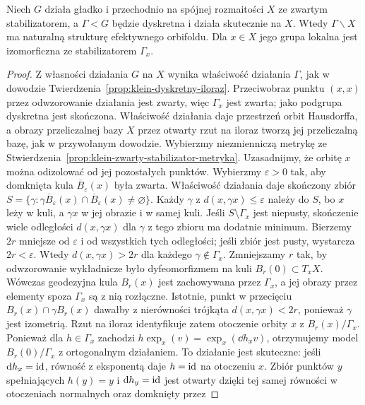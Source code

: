 \begin{stwierdzenie}
\label{prop:klein-iloraz-orbifoldowy}
Niech $G$ działa gładko i przechodnio na spójnej rozmaitości $X$
ze zwartym stabilizatorem, a $\Gamma<G$ będzie dyskretna i działa
skutecznie na $X$. Wtedy $\Gamma\backslash X$ ma naturalną
strukturę efektywnego orbifoldu. Dla $x\in X$ jego grupa lokalna
jest izomorficzna ze stabilizatorem $\Gamma_x$.
\end{stwierdzenie}
\begin{proof}
Z własności działania $G$ na $X$ wynika właściwość działania
$\Gamma$, jak w dowodzie
Twierdzenia~\ref{prop:klein-dyskretny-iloraz}. Przeciwobraz
punktu $(x,x)$ przez odwzorowanie działania jest zwarty, więc
$\Gamma_x$ jest zwarta; jako podgrupa dyskretna jest skończona.
Właściwość działania daje przestrzeń orbit Hausdorffa,
a obrazy przeliczalnej bazy $X$ przez otwarty rzut na iloraz
tworzą jej przeliczalną bazę, jak w przywołanym dowodzie.
Wybierzmy niezmienniczą metrykę ze
Stwierdzenia~\ref{prop:klein-zwarty-stabilizator-metryka}.
Uzasadnijmy, że orbitę $x$ można odizolować od jej pozostałych
punktów. Wybierzmy $\varepsilon>0$ tak, aby domknięta kula
$\overline B_\varepsilon(x)$ była zwarta.
Właściwość działania daje skończony zbiór
$S=\{\gamma:\gamma\overline B_\varepsilon(x)
\cap\overline B_\varepsilon(x)\ne\varnothing\}$.
Każdy $\gamma$ z $d(x,\gamma x)\leq\varepsilon$ należy do $S$,
bo $x$ leży w kuli, a $\gamma x$ w jej obrazie i w samej kuli.
Jeśli $S\setminus\Gamma_x$ jest niepusty, skończenie wiele
odległości $d(x,\gamma x)$ dla $\gamma$ z tego zbioru
ma dodatnie minimum. Bierzemy $2r$ mniejsze od
$\varepsilon$ i od wszystkich tych odległości;
jeśli zbiór jest pusty, wystarcza $2r<\varepsilon$.
Wtedy $d(x,\gamma x)>2r$ dla każdego $\gamma\notin\Gamma_x$.
Zmniejszamy $r$ tak, by
odwzorowanie wykładnicze było dyfeomorfizmem na kuli
$B_r(0)\subset T_xX$. Wówczas geodezyjna kula $B_r(x)$ jest
zachowywana przez $\Gamma_x$, a jej obrazy przez elementy spoza
$\Gamma_x$ są z nią rozłączne.
Istotnie, punkt w przecięciu $B_r(x)\cap\gamma B_r(x)$
dawałby z nierówności trójkąta $d(x,\gamma x)<2r$,
ponieważ $\gamma$ jest izometrią.
Rzut na iloraz identyfikuje zatem
otoczenie orbity $x$ z $B_r(x)/\Gamma_x$.
Ponieważ dla $h\in\Gamma_x$ zachodzi
$h\exp_x(v)=\exp_x(\dd h_xv)$, otrzymujemy model
$B_r(0)/\Gamma_x$ z ortogonalnym działaniem. To działanie jest
skuteczne: jeśli $\mathrm d h_x=\mathrm{id}$, równość z eksponentą daje
$h=\mathrm{id}$ na otoczeniu $x$. Zbiór punktów $y$ spełniających
$h(y)=y$ i $\mathrm d h_y=\mathrm{id}$ jest otwarty dzięki tej samej
równości w otoczeniach normalnych oraz domknięty przez

\end{proof}
